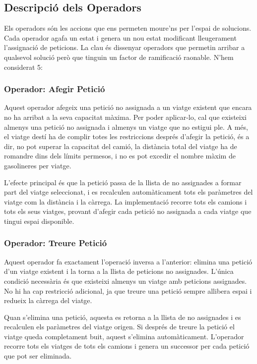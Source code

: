 \subsection{Descripció dels Operadors}

Els operadors són les accions que ens permeten moure'ns per l'espai de solucions. Cada operador agafa un estat i genera un nou estat modificant lleugerament l'assignació de peticions. La clau és dissenyar operadors que permetin arribar a qualsevol solució però que tinguin un factor de ramificació raonable. N'hem considerat 5:

\subsubsection{Operador: Afegir Petició}

Aquest operador afegeix una petició no assignada a un viatge existent que encara no ha arribat a la seva capacitat màxima. Per poder aplicar-lo, cal que existeixi almenys una petició no assignada i almenys un viatge que no estigui ple. A més, el viatge destí ha de complir totes les restriccions després d'afegir la petició, és a dir, no pot superar la capacitat del camió, la distància total del viatge ha de romandre dins dels límits permesos, i no es pot excedir el nombre màxim de gasolineres per viatge.

L'efecte principal és que la petició passa de la llista de no assignades a formar part del viatge seleccionat, i es recalculen automàticament tots els paràmetres del viatge com la distància i la càrrega. La implementació recorre tots els camions i tots els seus viatges, provant d'afegir cada petició no assignada a cada viatge que tingui espai disponible.

\subsubsection{Operador: Treure Petició}

Aquest operador fa exactament l'operació inversa a l'anterior: elimina una petició d'un viatge existent i la torna a la llista de peticions no assignades. L'única condició necessària és que existeixi almenys un viatge amb peticions assignades. No hi ha cap restricció adicional, ja que treure una petició sempre allibera espai i redueix la càrrega del viatge.

Quan s'elimina una petició, aquesta es retorna a la llista de no assignades i es recalculen els paràmetres del viatge origen. Si després de treure la petició el viatge queda completament buit, aquest s'elimina automàticament. L'operador recorre tots els viatges de tots els camions i genera un successor per cada petició que pot ser eliminada. 

